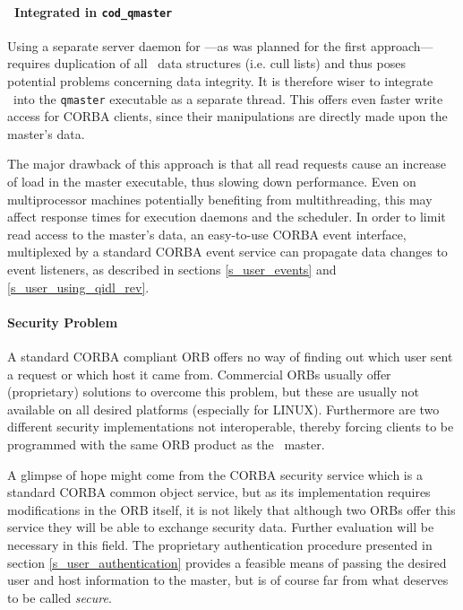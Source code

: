 \paragraph{\qidl\ Integrated in \texttt{cod\_qmaster}}
  Using a separate server daemon for \qidl---as was planned for the first
  approach---requires duplication of all \codine\
  data structures (i.e. cull lists) and thus poses potential problems 
  concerning data integrity. It is therefore wiser to integrate \qidl\ into
  the \texttt{qmaster} executable as a separate thread.
  This offers even faster write access for CORBA clients,
  since their manipulations are directly made upon the master's data.

  The major drawback of this approach is that all read requests cause an
  increase of load in the master executable, thus slowing down performance.
  Even on multiprocessor machines potentially benefiting from
  multithreading, this may affect response times for execution daemons and
  the scheduler.
  In order to limit read access to the master's data,
  an easy-to-use CORBA event interface,
  multiplexed by a standard CORBA event service can propagate data
  changes to event listeners, as described in sections \ref{s_user_events}
  and \ref{s_user_using_qidl_rev}.

\paragraph{Security Problem}
  A standard CORBA compliant ORB offers no way of finding out which user
  sent a request or which host it came from.
  Commercial ORBs usually offer (proprietary) solutions to overcome this 
  problem, but these are usually not available on all desired platforms 
  (especially for LINUX). Furthermore are two different security
  implementations not interoperable, thereby forcing clients to be programmed
  with the same ORB product as the \qidl\ master.

  A glimpse of hope might come from the CORBA security service which is a
  standard CORBA common object service, but as its implementation requires
  modifications in the ORB itself, it is not likely that although two ORBs
  offer this service they will be able to exchange security data. Further
  evaluation will be necessary in this field. The proprietary authentication
  procedure presented in section \ref{s_user_authentication} provides a
  feasible means of passing the desired user and host information to the
  master, but is of course far from what deserves to be called \emph{secure}.

